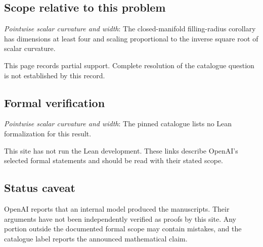 \documentclass[11pt]{article}
\begin{document}
\subsection{Scope relative to this problem}
\textit{Pointwise scalar curvature and width}: The closed-manifold filling-radius corollary has dimensions at least four and scaling proportional to the inverse square root of scalar curvature.

This page records partial support. Complete resolution of the catalogue question is not established by this record.

\subsection{Formal verification}
\textit{Pointwise scalar curvature and width}: The pinned catalogue lists no Lean formalization for this result.

This site has not run the Lean development. These links describe OpenAI’s selected formal statements and should be read with their stated scope.

\subsection{Status caveat}
OpenAI reports that an internal model produced the manuscripts. Their arguments have not been independently verified as proofs by this site. Any portion outside the documented formal scope may contain mistakes, and the catalogue label reports the announced mathematical claim.
\end{document}
